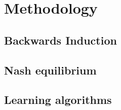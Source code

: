 \chapter{Methodology}
\section{Backwards Induction}
\section{Nash equilibrium}
\section{Learning algorithms}
